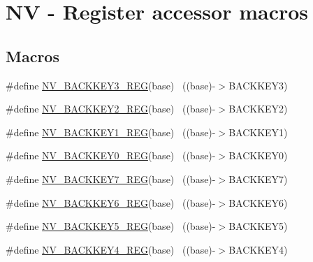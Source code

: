\hypertarget{group___n_v___register___accessor___macros}{}\section{NV -\/ Register accessor macros}
\label{group___n_v___register___accessor___macros}
\subsection*{Macros}
\begin{DoxyCompactItemize}
\item 
\#define \hyperlink{group___n_v___register___accessor___macros_ga3f3d8bddafcafafb27fb8981656492e1}{N\+V\+\_\+\+B\+A\+C\+K\+K\+E\+Y3\+\_\+\+R\+EG}(base)                                    ~((base)-\/$>$B\+A\+C\+K\+K\+E\+Y3)
\item 
\#define \hyperlink{group___n_v___register___accessor___macros_gaad90d55fc5c046a8e8508b04cbe2fbbb}{N\+V\+\_\+\+B\+A\+C\+K\+K\+E\+Y2\+\_\+\+R\+EG}(base)                                    ~((base)-\/$>$B\+A\+C\+K\+K\+E\+Y2)
\item 
\#define \hyperlink{group___n_v___register___accessor___macros_gaa618f324e87cf548f4736270e46fcc57}{N\+V\+\_\+\+B\+A\+C\+K\+K\+E\+Y1\+\_\+\+R\+EG}(base)                                    ~((base)-\/$>$B\+A\+C\+K\+K\+E\+Y1)
\item 
\#define \hyperlink{group___n_v___register___accessor___macros_ga905f2d4f792d634634d339e5b6170fe1}{N\+V\+\_\+\+B\+A\+C\+K\+K\+E\+Y0\+\_\+\+R\+EG}(base)                                    ~((base)-\/$>$B\+A\+C\+K\+K\+E\+Y0)
\item 
\#define \hyperlink{group___n_v___register___accessor___macros_ga7f6090f0eb664b59d0e6e79b492fe8e4}{N\+V\+\_\+\+B\+A\+C\+K\+K\+E\+Y7\+\_\+\+R\+EG}(base)                                    ~((base)-\/$>$B\+A\+C\+K\+K\+E\+Y7)
\item 
\#define \hyperlink{group___n_v___register___accessor___macros_ga9d64e9e2568804d0cf1de4cb5a1d3f1f}{N\+V\+\_\+\+B\+A\+C\+K\+K\+E\+Y6\+\_\+\+R\+EG}(base)                                    ~((base)-\/$>$B\+A\+C\+K\+K\+E\+Y6)
\item 
\#define \hyperlink{group___n_v___register___accessor___macros_gaeeb967dc21f8077cef911eae743d7f12}{N\+V\+\_\+\+B\+A\+C\+K\+K\+E\+Y5\+\_\+\+R\+EG}(base)                                    ~((base)-\/$>$B\+A\+C\+K\+K\+E\+Y5)
\item 
\#define \hyperlink{group___n_v___register___accessor___macros_gae867c53e6918c6a7c16ccba9ee512dc1}{N\+V\+\_\+\+B\+A\+C\+K\+K\+E\+Y4\+\_\+\+R\+EG}(base)                                    ~((base)-\/$>$B\+A\+C\+K\+K\+E\+Y4)

\end{DoxyCompactItemize}
